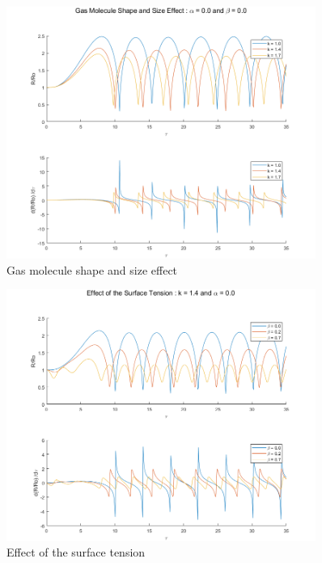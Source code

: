 \documentclass{article}
\begin{document}
\begin{figure}[h!]
	\centering
	\includegraphics[width=0.90\textwidth]{./matlab/growingBubbles_MoleculeShapeSize.png}
	\caption{Gas molecule shape and size effect}
	\label{img:growingBubblesMoleculeShape}
\end{figure}

\begin{figure}[h!]
	\centering
	\includegraphics[width=0.90\textwidth]{./matlab/growingBubbles_SurfaceTension.png}
	\caption{Effect of the surface tension}
	\label{img:growingBubblesSurfaceTension}
\end{figure}
\end{document}
